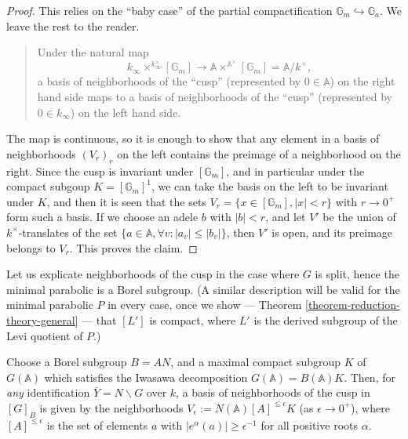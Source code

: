 \begin{proof}
This relies on the ``baby case'' of the partial compactification $\mathbb G_m\hookrightarrow \mathbb G_a$. We leave the rest to the reader.


 \begin{quote}
Under the natural map 
$$ k_\infty \times^{k_\infty^\times} [\mathbb G_m] \to \mathbb A \times^{\mathbb A^\times} [\mathbb G_m] = \mathbb A/k^\times,$$
a basis of neighborhoods of the ``cusp'' (represented by $0\in \mathbb A$) on the right hand side maps to a basis of neighborhoods of the ``cusp'' (represented by $0\in k_\infty$) on the left hand side.
\end{quote}

The map is continuous, so it is enough to show that any element in a basis of neighborhoods $(V_r)_r$ on the left contains the preimage of a neighborhood on the right. Since the cusp is invariant under $[\mathbb G_m]$, and in particular under the compact subgoup $K=[\mathbb G_m]^1$, we can take the basis on the left to be invariant under $K$, and then it is seen that the sets $V_r = \{ x\in [\mathbb G_m], |x|<r\}$  with $r\to 0^+$ form such a basis. If we choose an adele $b$ with $|b|<r$, and let $V'$ be the union of $k^\times$-translates of the set $\{a \in \mathbb A, \forall v:  |a_v|\le |b_v|\}$, then $V'$ is open, and its preimage belongs to $V_r$. This proves the claim. 

\end{proof}




\begin{remark}
 \label{remark-cusp-Iwasawa}
Let us explicate neighborhoods of the cusp in the case where $G$ is split, hence the minimal parabolic is a Borel subgroup. (A similar description will be valid for the minimal parabolic $P$ in every case, once we show --- Theorem \ref{theorem-reduction-theory-general} --- that $[L']$ is compact, where $L'$ is the derived subgroup of the Levi quotient of $P$.) 

Choose a Borel subgroup $B=AN$, and a maximal compact subgroup $K$ of $G(\mathbb A)$ which satisfies the Iwasawa decomposition $G(\mathbb A) = B(\mathbb A)K$. 
 Then, for \emph{any} identification $\bar Y = N\backslash G$ over $k$, a basis of neighborhoods of the cusp in $[G]_B$ is given by the neighborhoods $V_\epsilon := N(\mathbb A)[A]^{\le \epsilon}  K$ (as $\epsilon\to 0^+$), where $[A]^{\le \epsilon}$ is the set of elements $a$ with $|e^\alpha(a)|\ge \epsilon^{-1}$ for all positive roots $\alpha$. 
\end{remark} 

